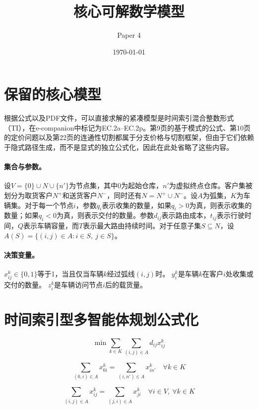 \documentclass{article}
\title{核心可解数学模型}
\author{Paper 4}
\date{\today}
\begin{document}
\maketitle

\section*{保留的核心模型}
根据\texttt{}公式以及PDF文件，可以直接求解的紧凑模型是时间索引混合整数形式（TI），在e-companion中标记为EC.2a--EC.2p。第9页的基于模式的公式、第10页的定价问题以及第22页的连通性切割都属于分支价格与切割框架，但由于它们依赖于隐式路径生成，而不是显式的独立公式化，因此在此处省略了这些内容。

\paragraph{集合与参数。}
设$V=\{0\}\cup N \cup \{n'\}$为节点集，其中$0$为起始仓库，$n'$为虚拟终点仓库。客户集被划分为取货客户$N^{+}$和送货客户$N^{-}$，同时还有$N=N^{+}\cup N^{-}$。设$A$为弧集，$K$为车辆集。对于每一个节点$i$，参数$q_i$表示收集的数量，如果$q_i>0$为真，则表示收集的数量；如果$q_i<0$为真，则表示交付的数量。参数$d_{ij}$表示路由成本，$t_{ij}$表示行驶时间，$Q$表示车辆容量，而$T$表示最大路由持续时间。对于任意子集$S \subseteq N$，设$A(S)=\{(i,j)\in A : i \in S,\ j \in S\}$。

\paragraph{决策变量。}
$x_{ij}^{k}\in\{0,1\}$等于1，当且仅当车辆$k$经过弧线$(i,j)$时。  
$y_i^k$是车辆$k$在客户$i$处收集或交付的数量。  
$z_i^k$是车辆访问节点$i$后的载货量。

\section*{时间索引型多智能体规划公式化}
\begin{equation}
\min \sum_{k \in K} \sum_{(i,j) \in A} d_{ij} x_{ij}^{k}
\tag{EC.2a}
\end{equation}

\begin{equation}
\sum_{(0,i) \in A} x_{0i}^{k} = \sum_{(i,n') \in A} x_{in'}^{k}
\quad \forall k \in K
\tag{EC.2b}
\end{equation}

\begin{equation}
\sum_{(i,j) \in A} x_{ij}^{k} = \sum_{(j,i) \in A} x_{ji}^{k}
\quad \forall i \in V,\ \forall k \in K
\tag{EC.2c}
\end{equation}
\end{document}
